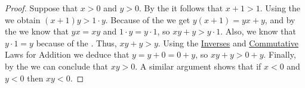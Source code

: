 \begin{proof}
	Suppose that $x > 0$ and $y > 0$. By the  it follows that $x + 1 > 1$. Using the  we obtain $(x + 1)y > 1 \cdot y$. Because of the  we get $y(x + 1) = yx + y$, and by the  we know that $y x = x y$ and $1 \cdot y = y \cdot 1$, so $x y + y > y \cdot 1$. Also, we know that $y \cdot 1 = y$ because of the . Thus, $x y + y > y$. Using the \hyperref[int:t:props:inverses_add]{Inverses} and \hyperref[int:t:props:commutative_add]{Commutative} Laws for Addition we deduce that $y = y + 0 = 0 + y$, so $x y + y > 0 + y$. Finally, by the  we can conclude that $x y > 0$. A similar argument shows that if $x < 0$ and $y < 0$ then $x y < 0$.
\end{proof}
